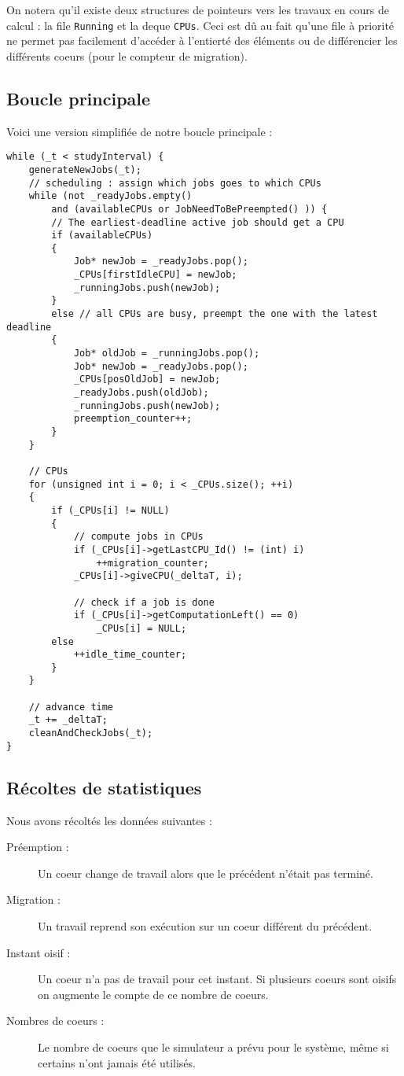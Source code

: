 \documentclass[a4paper,10pt]{article}
\begin{document}
On notera qu'il existe deux structures de pointeurs vers les travaux en cours de calcul : la file \verb?Running? et la deque \verb?CPUs?. Ceci est dû au fait qu'une file à priorité ne permet pas facilement d'accéder à l'entierté des éléments ou de différencier les différents coeurs (pour le compteur de migration).

\subsection{Boucle principale}
Voici une version simplifiée de notre boucle principale :
\begin{lstlisting}
while (_t < studyInterval) {
	generateNewJobs(_t);
	// scheduling : assign which jobs goes to which CPUs
	while (not _readyJobs.empty()
		and (availableCPUs or JobNeedToBePreempted() )) {
		// The earliest-deadline active job should get a CPU
		if (availableCPUs)
		{
			Job* newJob = _readyJobs.pop();
			_CPUs[firstIdleCPU] = newJob;
			_runningJobs.push(newJob);
		}
		else // all CPUs are busy, preempt the one with the latest deadline
		{
			Job* oldJob = _runningJobs.pop();
			Job* newJob = _readyJobs.pop();
			_CPUs[posOldJob] = newJob;
			_readyJobs.push(oldJob);
			_runningJobs.push(newJob);
			preemption_counter++;
		}
	}

	// CPUs
	for (unsigned int i = 0; i < _CPUs.size(); ++i)
	{
		if (_CPUs[i] != NULL)
		{
			// compute jobs in CPUs
			if (_CPUs[i]->getLastCPU_Id() != (int) i)
				++migration_counter;
			_CPUs[i]->giveCPU(_deltaT, i);

			// check if a job is done
			if (_CPUs[i]->getComputationLeft() == 0)
				_CPUs[i] = NULL;
		else
			++idle_time_counter;
		}
	}

	// advance time
	_t += _deltaT;
	cleanAndCheckJobs(_t);
}
\end{lstlisting}
\fontfamily{}

\subsection{Récoltes de statistiques}

Nous avons récoltés les données suivantes :

\begin{description}
 \item[Préemption :] Un coeur change de travail alors que le précédent n'était pas terminé.
 \item[Migration :] Un travail reprend son exécution sur un coeur différent du précédent.
 \item[Instant oisif :] Un coeur n'a pas de travail pour cet instant. Si plusieurs coeurs sont oisifs on augmente le compte de ce nombre de coeurs.
 \item[Nombres de coeurs :] Le nombre de coeurs que le simulateur a prévu pour le système, même si certains n'ont jamais été utilisés.
\end{description}
\end{document}
